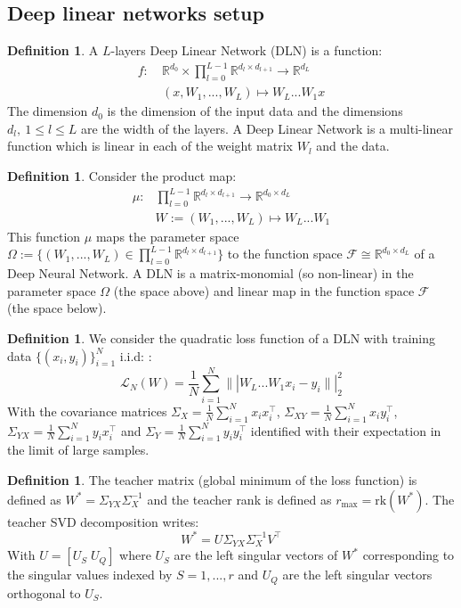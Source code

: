 \documentclass{article}
\theoremstyle{definition}
\newtheorem{definition}[theorem]{Definition}
\begin{document}
\subsection{Deep linear networks setup}
\begin{definition}\label{def:dln-function}
    A $L$-layers Deep Linear Network (DLN) is a function:
\begin{align*}
    f: \ & \mathbb{R}^{d_0} \times \prod_{l=0}^{L-1}\mathbb{R}^{d_l \times d_{l+1}}  \to \mathbb{R}^{d_L} \\
       & (x,W_1,...,W_L) \mapsto W_L...W_1 x
\end{align*}
The dimension $d_0$ is the dimension of the input data and the dimensions $d_l,\ 1\leq l \leq L$ are the width of the layers. A Deep Linear Network is a multi-linear function which is linear in each of the weight matrix $W_l$ and the data.
\end{definition}
\begin{definition}\label{def:product-map}
    Consider the product map:
\begin{align*}
    \mu : & \prod_{l=0}^{L-1}\mathbb{R}^{d_l \times d_{l+1}} \to \mathbb{R}^{d_0\times d_L}\\
           &  W:=(W_1,...,W_L) \mapsto W_L...W_1
\end{align*}
This function $\mu$ maps the parameter space $\Omega:=\{(W_1,...,W_L) \in \prod_{l=0}^{L-1}\mathbb{R}^{d_l \times d_{l+1}}\}$ to the function space $\mathcal{F} \cong \mathbb{R}^{d_0\times d_L}$ of a Deep Neural Network. A DLN is a matrix-monomial (so non-linear) in the parameter space $\Omega$ (the space above) and linear map in the function space $\mathcal{F}$ (the space below).
\end{definition}
\begin{definition}
We consider the quadratic loss function of a DLN with training data $\{(x_i,y_i)\}_{i=1}^N$ i.i.d: :
    \begin{equation*}
        \mathcal{L}_N(W) = \frac{1}{N}\sum_{i=1}^N \||W_L...W_1 x_i - y_i\||_2^2
    \end{equation*}
With the covariance matrices $\Sigma_X = \frac{1}{N}\sum_{i=1}^N x_i x_i^\top$, $\Sigma_{XY} = \frac{1}{N}\sum_{i=1}^N x_i y_i^\top$, $\Sigma_{YX} = \frac{1}{N}\sum_{i=1}^N y_i x_i^\top$ and $\Sigma_Y = \frac{1}{N}\sum_{i=1}^N y_i y_i^\top$ identified with their expectation in the limit of large samples.
\end{definition}
\begin{definition}\label{def:teacher-matrix}
    The teacher matrix (global minimum of the loss function) is defined as $W^* = \Sigma_{YX}\Sigma_X^{-1}$ and the teacher rank is defined as $r_{\max} = \text{rk}(W^*)$. The teacher SVD decomposition writes:
    \begin{equation*}
        W^* = U \Sigma_{YX}\Sigma_X^{-1} V^\top
    \end{equation*}
    With $U = [U_S\; U_Q]$ where $U_S$ are the left singular vectors of $W^*$ corresponding to the singular values indexed by $S={1,...,r}$ and $U_Q$ are the left singular vectors orthogonal to $U_S$. 
\end{definition}
\end{document}
